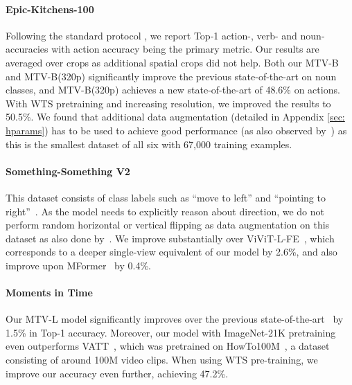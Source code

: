 \paragraph{Epic-Kitchens-100}
Following the standard protocol \cite{damen2021rescaling}, we report Top-1 action-, verb- and noun-accuracies with action accuracy being the primary metric.
Our results are averaged over  crops as additional spatial crops did not help.
Both our MTV-B and MTV-B(320p) significantly improve the previous state-of-the-art on noun classes, and MTV-B(320p) achieves a new state-of-the-art of 48.6\% on actions. With WTS pretraining and increasing resolution, we improved the results to 50.5\%. 
We found that additional data augmentation (detailed in Appendix \ref{sec: hparams}) has to be used to achieve good performance (as also observed by~\cite{arnab2021vivit, patrick2021keeping}) as this is the smallest dataset of all six with 67,000 training examples. 


\paragraph{Something-Something V2}
This dataset consists of class labels such as ``move to left'' and ``pointing to right''~\cite{goyal_iccv_2017}.
As the model needs to explicitly reason about direction, we do not perform random horizontal or vertical flipping as data augmentation on this dataset as also done by~\cite{fan2021multiscale}.
We improve substantially over ViViT-L-FE~\cite{arnab2021vivit}, which corresponds to a deeper single-view equivalent of our model by 2.6\%, and also improve upon MFormer~\cite{patrick2021keeping} by 0.4\%.


\paragraph{Moments in Time} 
Our MTV-L model significantly improves over the previous state-of-the-art~\cite{kondratyuk2021movinets} by 1.5\% in Top-1 accuracy.
Moreover, our model with ImageNet-21K pretraining even outperforms VATT~\cite{akbari2021vatt}, which was pretrained on HowTo100M~\cite{miech2019howto100m}, a dataset consisting of around 100M video clips.
When using WTS pre-training, we improve our accuracy even further, achieving 47.2\%.

